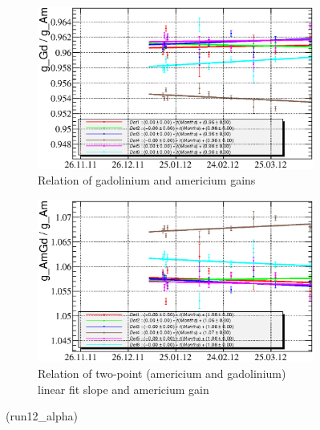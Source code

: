 \documentclass[a4paper,12pt]{article}
\begin{document}
\begin{figure}[htb]
\begin{subfigure}[t]{0.49\textwidth}
\includegraphics[width=\textwidth]{gfx/run12_alpha/Y2U/c_chGdGain_over_AmGain_by_day_Y2U.eps}
\caption{Relation of gadolinium and americium gains}
\end{subfigure}
%
\hfill
%
\begin{subfigure}[t]{0.49\textwidth}
\includegraphics[width=\textwidth]{gfx/run12_alpha/Y2U/c_chAmGdGain_over_AmGain_by_day_Y2U.eps}
\caption{Relation of two-point (americium and gadolinium) linear fit slope and americium gain}
\end{subfigure}
\caption{\gainrealationslabel (run12\_alpha)}
\end{figure}
\end{document}
